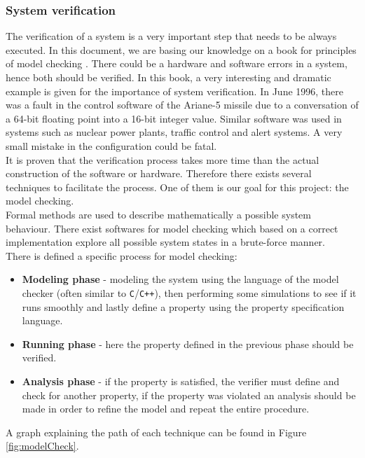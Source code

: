 \documentclass[a4paper, twocolumn]{article}
\begin{document}
\subsubsection{System verification} \label{sysVerif}
The verification of a system is a very important step that needs to be always executed. In this document, we are basing our knowledge on a book for principles of model checking \cite{book}. There could be a hardware and software errors in a system, hence both should be verified. In this book, a very interesting and dramatic example is given for the importance of system verification. In June 1996, there was a fault in the control software of the Ariane-5 missile due to a conversation of a 64-bit floating point into a 16-bit integer value. Similar software was used in systems such as nuclear power plants, traffic control and alert systems. A very small mistake in the configuration could be fatal.\\
It is proven that the verification process takes more time than the actual construction of the software or hardware. Therefore there exists several techniques to facilitate the process. One of them is our goal for this project: the model checking.\\
Formal methods are used to describe mathematically a possible system behaviour. There exist softwares for model checking which based on a correct implementation explore all possible system states in a brute-force manner.\\
There is defined a specific process for model checking:
\begin{itemize}
    \item \textbf{Modeling phase} - modeling the system using the language of the model checker (often similar to \texttt{C}/\texttt{C++}), then performing some simulations to see if it runs smoothly and lastly define a property using the property specification language.
    \item \textbf{Running phase} - here the property defined in the previous phase should be verified.
    \item \textbf{Analysis phase} - if the property is satisfied, the verifier must define and check for another property, if the property was violated an analysis should be made in order to refine the model and repeat the entire procedure.
\end{itemize}
A graph explaining the path of each technique can be found in Figure \ref{fig:modelCheck}.
\end{document}
